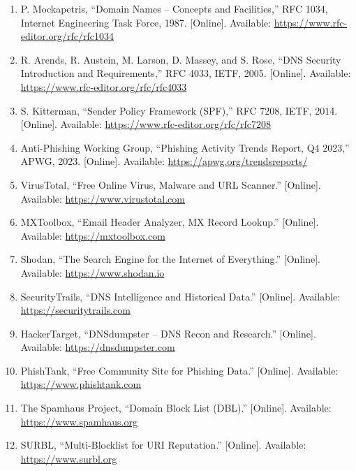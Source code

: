 \documentclass[12pt, a4paper, oneside]{report}
\begin{document}
\begin{enumerate}

  \item P. Mockapetris, ``Domain Names -- Concepts and Facilities,'' RFC 1034, Internet Engineering Task Force, 1987. [Online]. Available: \url{https://www.rfc-editor.org/rfc/rfc1034}

  \item R. Arends, R. Austein, M. Larson, D. Massey, and S. Rose, ``DNS Security Introduction and Requirements,'' RFC 4033, IETF, 2005. [Online]. Available: \url{https://www.rfc-editor.org/rfc/rfc4033}

  \item S. Kitterman, ``Sender Policy Framework (SPF),'' RFC 7208, IETF, 2014. [Online]. Available: \url{https://www.rfc-editor.org/rfc/rfc7208}

  \item Anti-Phishing Working Group, ``Phishing Activity Trends Report, Q4 2023,'' APWG, 2023. [Online]. Available: \url{https://apwg.org/trendsreports/}

  \item VirusTotal, ``Free Online Virus, Malware and URL Scanner.'' [Online]. Available: \url{https://www.virustotal.com}

  \item MXToolbox, ``Email Header Analyzer, MX Record Lookup.'' [Online]. Available: \url{https://mxtoolbox.com}

  \item Shodan, ``The Search Engine for the Internet of Everything.'' [Online]. Available: \url{https://www.shodan.io}

  \item SecurityTrails, ``DNS Intelligence and Historical Data.'' [Online]. Available: \url{https://securitytrails.com}

  \item HackerTarget, ``DNSdumpster -- DNS Recon and Research.'' [Online]. Available: \url{https://dnsdumpster.com}

  \item PhishTank, ``Free Community Site for Phishing Data.'' [Online]. Available: \url{https://www.phishtank.com}

  \item The Spamhaus Project, ``Domain Block List (DBL).'' [Online]. Available: \url{https://www.spamhaus.org}

  \item SURBL, ``Multi-Blocklist for URI Reputation.'' [Online]. Available: \url{https://www.surbl.org}


\end{enumerate}
\end{document}
